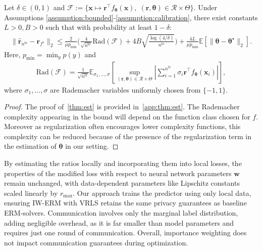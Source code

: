 \begin{theorem}
\label{thm:est}
    Let $\delta \in (0,1)$ and $\mathcal{F} := \{ \boldsymbol{x} \mapsto \boldsymbol{r}^\top f_{\boldsymbol{\theta}}(\boldsymbol{x}), \; (\boldsymbol{r}, \boldsymbol{\theta}) \in\mathcal{R}\times\Theta\}$. Under  Assumptions \ref{assumption:bounded}-\ref{assumption:calibration}, there exist constants $L>0, B>0$ such that with probability at least $1-\delta$:
    \begin{align}
    \| \hat{\boldsymbol{r}}_{{n}^{\text{te}}} - \boldsymbol{r}_{f^\star} \|_2 \leq \frac{2}{\mu p_{\min}}\Big( \frac{4}{\sqrt{{n}^{\text{te}}}} \text{Rad}(\mathcal{F}) + 4B\sqrt{\frac{\log(4/\delta)}{{n}^{\text{te}}}} \Big)+ \frac{4L}{\mu p_{\min}} \mathbb{E} \left[ {\|\boldsymbol{\theta} - \boldsymbol{\theta}^\star\|_2} \right].
    \end{align}
    Here, $p_{\min} = \min_{y} p(y)$ and
    \begin{align}
    \text{Rad}(\mathcal{F}) = \frac{1}{\sqrt{{n}^{\text{tr}}}} \mathbb{E}_{\sigma_1, \dots, \sigma}\left[ \sup_{(\boldsymbol{r}, \boldsymbol{\theta})\in\mathcal{R}\times\Theta} \left|\sum_{i=1}^{{n}^{\text{tr}}}\sigma_i \boldsymbol{r}^\top f_{{\boldsymbol{\theta}}}(\boldsymbol{x}_i)\right|\right],
    \end{align}
where $\sigma_1, \dots, \sigma$ are Rademacher variables uniformly chosen from $\{-1,1\}$.
\end{theorem}

\begin{proof}
The proof of~\cref{thm:est} is provided in~\cref{app:thm:est}. The Rademacher complexity appearing in the bound will depend on the function class chosen for $f$. Moreover as regularization often encourages lower complexity functions, this complexity can be reduced because of the presence of the regularization term in the estimation of $\boldsymbol{\theta}$ in our setting.
\end{proof}


By estimating the ratios locally and incorporating them into local losses, the properties of the modified loss with respect to neural network parameters $\boldsymbol{w}$ remain unchanged, with data-dependent parameters like Lipschitz constants scaled linearly by $r_{\max}$. Our approach trains the predictor using only local data, ensuring IW-ERM with VRLS retains the same privacy guarantees as baseline ERM-solvers. Communication involves only the marginal label distribution, adding negligible overhead, as it is far smaller than model parameters and requires just one round of communication. Overall, importance weighting does not impact communication guarantees during optimization.

